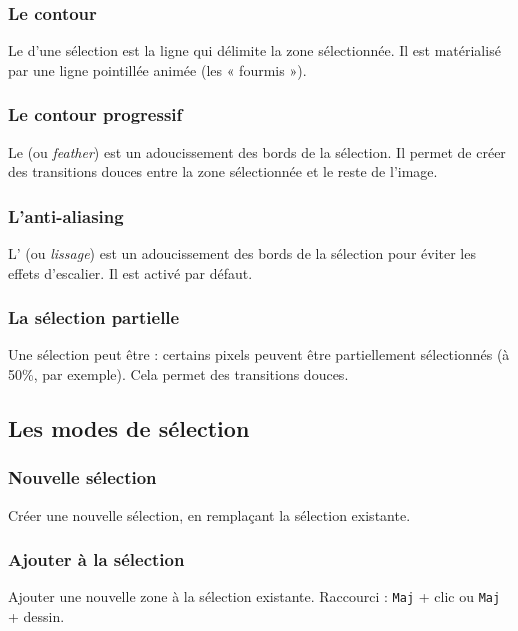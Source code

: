 \subsubsection{Le contour}

Le  d'une sélection est la ligne qui délimite la zone sélectionnée. Il est matérialisé par une ligne pointillée animée (les « fourmis »).

\subsubsection{Le contour progressif}

Le  (ou \emph{feather}) est un adoucissement des bords de la sélection. Il permet de créer des transitions douces entre la zone sélectionnée et le reste de l'image.

\subsubsection{L'anti-aliasing}

L' (ou \emph{lissage}) est un adoucissement des bords de la sélection pour éviter les effets d'escalier. Il est activé par défaut.

\subsubsection{La sélection partielle}

Une sélection peut être  : certains pixels peuvent être partiellement sélectionnés (à 50\%, par exemple). Cela permet des transitions douces.

\subsection{Les modes de sélection}

\subsubsection{Nouvelle sélection}

Créer une nouvelle sélection, en remplaçant la sélection existante.

\subsubsection{Ajouter à la sélection}

Ajouter une nouvelle zone à la sélection existante. Raccourci : \texttt{Maj} + clic ou \texttt{Maj} + dessin.

